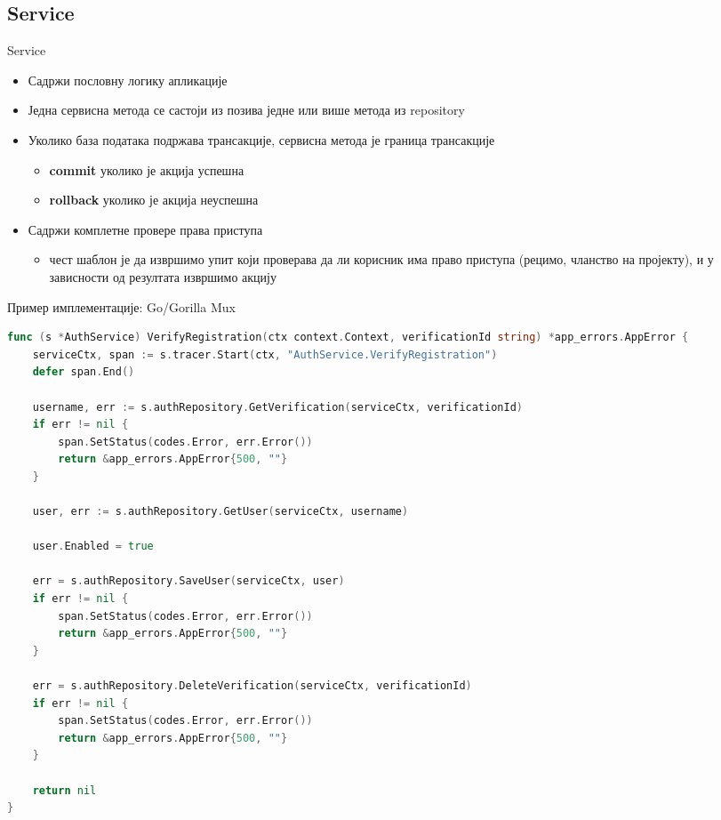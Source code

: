 \documentclass[aspectratio=169]{beamer}
\begin{document}
    \subsection[]{Service}
    
    \begin{frame}{Service}
        \begin{itemize}
            \item Садржи пословну логику апликације
            \item Једна сервисна метода се састоји из позива једне или више метода из repository
            \item Уколико база података подржава трансакције, сервисна метода је граница трансакције
            \begin{itemize}
                \item \textbf{commit} уколико је акција успешна
                \item \textbf{rollback} уколико је акција неуспешна
            \end{itemize}
            \item Садржи комплетне провере права приступа
            \begin{itemize}
                \item чест шаблон је да извршимо упит који проверава да ли корисник има право приступа (рецимо, чланство на пројекту), и у зависности од резултата извршимо акцију
            \end{itemize}
        \end{itemize}
    \end{frame}
    
    \begin{frame}[fragile]{Пример имплементације: Go/Gorilla Mux}
        \begin{adjustbox}{width=\textwidth,height=\textheight,keepaspectratio}
            \begin{lstlisting}[language=go]
func (s *AuthService) VerifyRegistration(ctx context.Context, verificationId string) *app_errors.AppError {
    serviceCtx, span := s.tracer.Start(ctx, "AuthService.VerifyRegistration")
    defer span.End()

    username, err := s.authRepository.GetVerification(serviceCtx, verificationId)
    if err != nil {
        span.SetStatus(codes.Error, err.Error())
        return &app_errors.AppError{500, ""}
    }

    user, err := s.authRepository.GetUser(serviceCtx, username)

    user.Enabled = true

    err = s.authRepository.SaveUser(serviceCtx, user)
    if err != nil {
        span.SetStatus(codes.Error, err.Error())
        return &app_errors.AppError{500, ""}
    }

    err = s.authRepository.DeleteVerification(serviceCtx, verificationId)
    if err != nil {
        span.SetStatus(codes.Error, err.Error())
        return &app_errors.AppError{500, ""}
    }

    return nil
}
            \end{lstlisting}
        \end{adjustbox}
    \end{frame}
    
\end{document}
